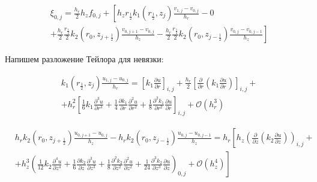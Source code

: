 \begin{align*}
  &\xi_{0, j} = \frac{h_r}{2} h_z f_{0, j} + \left [ 
    h_z r_{\frac{1}{2}} k_1(r_{\frac{1}{2}}, z_j) \frac{v_{1, j} - v_{0, j}}{h_{r}}
    - 0
    \right . \\
    &\left .
    + \frac{h_r}{2} \frac{r_{\frac{1}{2}}}{2} k_2(r_0, z_{j+\frac{1}{2}}) \frac{v_{0, j + 1} - v_{0, j}}{h_{z}}
    - \frac{h_r}{2} \frac{r_{\frac{1}{2}}}{2} k_2(r_0, z_{j-\frac{1}{2}}) \frac{v_{0, j} - v_{0, j - 1}}{h_z}
    \right ]
\end{align*}

Напишем разложение Тейлора для невязки:

\begin{align*}
  &k_1(r_\frac{1}{2}, z_j) \frac{u_{1, j} - u_{0, j}}{h_r} = \left[ k_1 \frac{\partial u}{ \partial r} \right]_{i, j}
  + \frac{h_r}{2} \left[ \frac{\partial }{ \partial r} \left( k_1 \frac{\partial u}{ \partial r} \right) \right]_{i, j} + \\
  &+ h^2_r \left[
    \frac{1}{6}k_1 \frac{\partial^3 u}{ \partial r^3} +
    \frac{1}{4} \frac{\partial k_1}{ \partial r} \frac{\partial^2 u}{ \partial r^2} +
    \frac{1}{8} \frac{\partial^2 k_1}{ \partial r^2} \frac{\partial u}{ \partial r}
  \right]_{i ,j} + \mathcal{O}(h^3_r)
\end{align*}

\begin{align*}
  &h_r k_2(r_0, z_{j + \frac{1}{2}}) \frac{u_{0, j + 1} - u_{0, j}}{h_z} -
  h_r k_2(r_0, z_{j - \frac{1}{2}}) \frac{u_{0, j} - u_{0, j - 1}}{h_z} =
  h_r \left[ h_z \left( \frac{\partial }{ \partial z} \left( k_2 \frac{\partial u}{ \partial z} \right) \right)_{i, j} \right. + \\
  &\left. + h^3_z \left( 
    \frac{1}{12}k_2 \frac{\partial^4 u}{ \partial z^4}  +
    \frac{1}{6} \frac{\partial k_2}{ \partial z} \frac{\partial^3 u}{ \partial z^3} +
    \frac{1}{8} \frac{\partial^2 k_2}{ \partial z^2} \frac{\partial^2 u}{ \partial z^2} +
    \frac{1}{24} \frac{\partial^3 k_2}{ \partial z^3} \frac{\partial u}{ \partial z} \right)_{0, j}
    + \mathcal{O}(h^4_z)
  \right]
\end{align*}

